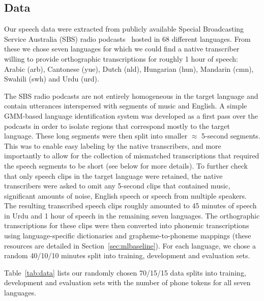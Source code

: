 
\subsection{Data}
\label{sec:data}

Our speech data were extracted from publicly available Special Broadcasting Service Australia (SBS) radio podcasts~\cite{SBS} hosted in 68 different languages. From these we chose seven languages for which we could find a native transcriber willing to provide orthographic transcriptions for roughly 1 hour of speech: Arabic (arb), Cantonese (yue), Dutch (nld), Hungarian (hun), Mandarin (cmn), Swahili (swh) and Urdu (urd).

The SBS radio podcasts are not entirely homogeneous in the target language and contain utterances interspersed with segments of music and English. A simple GMM-based language identification system was developed as a first pass over the podcasts in order to isolate regions that correspond mostly to the target language. These long segments were then split into smaller $\approx$ 5-second segments. This was to enable easy labeling by the native transcribers, and more importantly to allow for the collection of mismatched transcriptions that required the speech segments to be short (see below for more details). To further check that only speech clips in the target language were retained, the native transcribers were asked to omit any 5-second clips that contained music, significant amounts of noise, English speech or speech from multiple speakers. The resulting transcribed speech clips roughly amounted to 45 minutes of speech in Urdu and 1 hour of speech in the remaining seven languages. The orthographic transcriptions for these clips were then converted into phonemic transcriptions using language-specific dictionaries and grapheme-to-phoneme mappings (these resources are detailed in Section~\ref{sec:mlbaseline}). For each language, we chose a random 40/10/10 minutes split into training, development and evaluation sets. 

Table~\ref{tab:data} lists our randomly chosen 70/15/15 data splits into training, development and evaluation sets with the number of phone tokens for all seven languages. 


